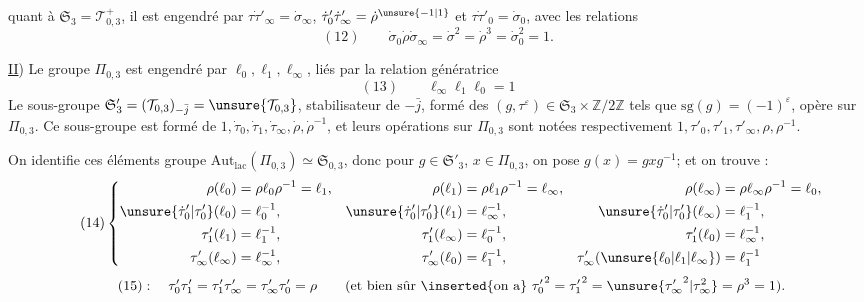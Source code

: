 quant à $\mathfrak S_3=\mathcal T_{0,3}^{+}$, il est engendré par
$\tau\dot\tau'_\infty=\dot\sigma_\infty$, $\dot\tau'_0\dot\tau'_\infty=\dot\rho^{\unsure{-1|1}}$ et $\tau\dot\tau'_0=\dot\sigma_0$, avec les relations
\[
(12)\qquad
\dot\sigma_0\dot\rho\dot\sigma_\infty=\dot\sigma^2=\dot\rho^3=\dot\sigma_0^2=1.
\]

\uline{II}) Le groupe $\Pi_{0,3}$ est engendré par $\ell_0,\ell_1,\ell_\infty$, liés par la relation génératrice
\[
(13)\qquad \ell_\infty \ell_1\ell_0=1
\]
Le  sous-groupe 
$\mathfrak S'_3=(\mathcal T_{0,3})_{-\bar j}=\unsure{\mathcal T_{0,3}}$,
stabilisateur de $-\bar j$, formé des $(g,\tau^\varepsilon)\in\mathfrak S_3\times\mathbb Z/2\mathbb Z$ tels que $\mathrm{sg}(g)=(-1)^\varepsilon$, opère sur $\Pi_{0,3}$.
Ce sous-groupe est formé de $1,\dot\tau_0,\dot\tau_1,\dot\tau_\infty,\dot\rho,\dot\rho^{-1}$, et leurs opérations sur $\Pi_{0,3}$ sont notées respectivement $1,\tau'_0,\tau'_1,\tau'_\infty,\rho,\rho^{-1}$.



\quad{}
On identifie ces éléments   groupe
$\mathrm{Aut}_{\mathrm{lac}}(\Pi_{0,3})\simeq\mathfrak S_{0,3}$,
donc  pour $g\in\mathfrak S'_3$, $x\in\Pi_{0,3}$, on pose
$g(x)=gxg^{-1}$; et on trouve :
\[
\tag{14}
\left\{\begin{aligned}
\rho(\ell_0)&=\rho\ell_0\rho^{-1}=\ell_1,&
\rho(\ell_1)&=\rho\ell_1\rho^{-1}=\ell_\infty,&
\rho(\ell_\infty)&=\rho\ell_\infty\rho^{-1}=\ell_0,\\
\unsure{\dot\tau'_0|\tau'_0}(\ell_0)&=\ell_0^{-1},&
\unsure{\dot\tau'_0|\tau'_0}(\ell_1)&=\ell_\infty^{-1},&
\unsure{\dot\tau'_0|\tau'_0}(\ell_\infty)&=\ell_1^{-1},\\
\tau'_1(\ell_1)&=\ell_1^{-1},&
\tau'_1(\ell_\infty)&=\ell_0^{-1},&
\tau'_1(\ell_0)&=\ell_\infty^{-1},\\
\tau'_\infty(\ell_\infty)&=\ell_\infty^{-1},&
\tau'_\infty(\ell_0)&=\ell_1^{-1},&
\tau'_\infty(\unsure{\ell_0|\ell_1|\ell_\infty})&=\ell_1^{-1}
\end{aligned}\right.
\]
\[
\tag{15}
:\quad\tau'_0\tau'_1=\tau'_1\tau'_\infty=\tau'_\infty\tau'_0=\rho
\qquad\text{(et bien sûr \inserted{on a} }{\tau'_0}^{2}={\tau'_1}^{2}=\unsure{{\tau'_\infty}^{2}|\tau_\infty^{2}}=\rho^3=1\text{).}
\]

